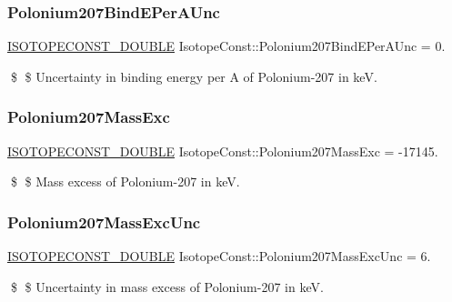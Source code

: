 \subsubsection{\texorpdfstring{Polonium207\+Bind\+E\+Per\+A\+Unc}{Polonium207BindEPerAUnc}}
{\footnotesize\ttfamily \mbox{\hyperlink{group___isotope_const-_macros_ga8f45a7272ce02c0b4c65c44636ed719a}{I\+S\+O\+T\+O\+P\+E\+C\+O\+N\+S\+T\+\_\+\+D\+O\+U\+B\+LE}} Isotope\+Const\+::\+Polonium207\+Bind\+E\+Per\+A\+Unc = 0.}

\$ \$ Uncertainty in binding energy per A of Polonium-\/207 in keV. \mbox{\label{group___isotope_const-_polonium-_po207_ga9700001c68a8d4b0f597f633c959ab9c}} 
\subsubsection{\texorpdfstring{Polonium207\+Mass\+Exc}{Polonium207MassExc}}
{\footnotesize\ttfamily \mbox{\hyperlink{group___isotope_const-_macros_ga8f45a7272ce02c0b4c65c44636ed719a}{I\+S\+O\+T\+O\+P\+E\+C\+O\+N\+S\+T\+\_\+\+D\+O\+U\+B\+LE}} Isotope\+Const\+::\+Polonium207\+Mass\+Exc = -\/17145.}

\$ \$ Mass excess of Polonium-\/207 in keV. \mbox{\label{group___isotope_const-_polonium-_po207_gaa984110d2e50be5bb6bef09986b4e960}} 
\subsubsection{\texorpdfstring{Polonium207\+Mass\+Exc\+Unc}{Polonium207MassExcUnc}}
{\footnotesize\ttfamily \mbox{\hyperlink{group___isotope_const-_macros_ga8f45a7272ce02c0b4c65c44636ed719a}{I\+S\+O\+T\+O\+P\+E\+C\+O\+N\+S\+T\+\_\+\+D\+O\+U\+B\+LE}} Isotope\+Const\+::\+Polonium207\+Mass\+Exc\+Unc = 6.}

\$ \$ Uncertainty in mass excess of Polonium-\/207 in keV. \mbox{\label{group___isotope_const-_polonium-_po207_ga2acaa5285ae419ba74379a15f175653b}} 
